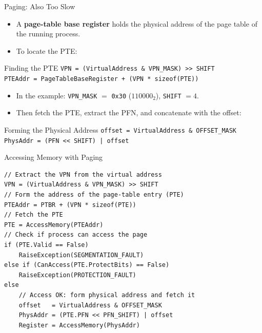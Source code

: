 \begin{frame}[fragile]{Paging: Also Too Slow}

\begin{itemize}
    \item A \textbf{page-table base register} holds the physical address of
          the page table of the running process.
    \item To locate the PTE:
\end{itemize}

\begin{block}{Finding the PTE}
\small
\texttt{VPN = (VirtualAddress \& VPN\_MASK) >> SHIFT}\\
\texttt{PTEAddr = PageTableBaseRegister + (VPN * sizeof(PTE))}
\end{block}

\begin{itemize}
    \item In the example: \texttt{VPN\_MASK} $=$ \texttt{0x30} ($110000_2$),
          \texttt{SHIFT} $=4$.
    \item Then fetch the PTE, extract the PFN, and concatenate with the offset:
\end{itemize}

\begin{block}{Forming the Physical Address}
\small
\texttt{offset = VirtualAddress \& OFFSET\_MASK}\\
\texttt{PhysAddr = (PFN << SHIFT) | offset}
\end{block}

\end{frame}

\begin{frame}[fragile]{Accessing Memory with Paging}

\begin{lstlisting}[style=CStyle]
// Extract the VPN from the virtual address
VPN = (VirtualAddress & VPN_MASK) >> SHIFT
// Form the address of the page-table entry (PTE)
PTEAddr = PTBR + (VPN * sizeof(PTE))
// Fetch the PTE
PTE = AccessMemory(PTEAddr)
// Check if process can access the page
if (PTE.Valid == False)
    RaiseException(SEGMENTATION_FAULT)
else if (CanAccess(PTE.ProtectBits) == False)
    RaiseException(PROTECTION_FAULT)
else
    // Access OK: form physical address and fetch it
    offset   = VirtualAddress & OFFSET_MASK
    PhysAddr = (PTE.PFN << PFN_SHIFT) | offset
    Register = AccessMemory(PhysAddr)
\end{lstlisting}

\end{frame}

